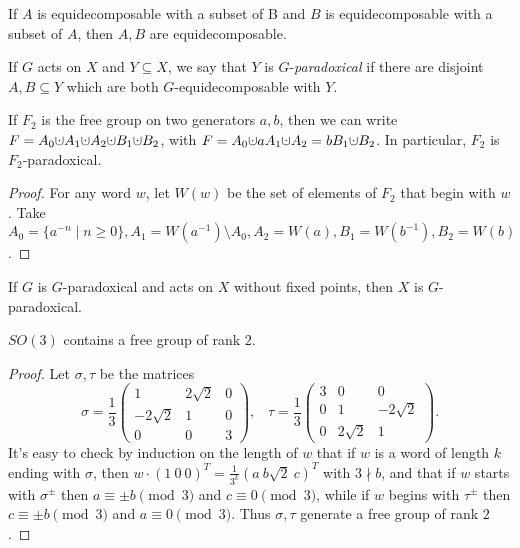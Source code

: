 \begin{prop} If $A$ is equidecomposable with a subset of B and $B$ is equidecomposable with a subset of $A$, then $A,B$ are equidecomposable.
\end{prop}

\begin{defn} If $G$ acts on $X$ and $Y \subseteq X$, we say that $Y$ is $G$-\emph{paradoxical} if there are disjoint $A,B \subseteq Y$ which are both $G$-equidecomposable with $Y$.
\end{defn}

\begin{prop} If $F_2$ is the free group on two generators $a,b$, then we can write $F = A_0 \dotcup A_1 \dotcup A_2 \dotcup B_1 \dotcup B_2$, with $F = A_0 \dotcup aA_1 \dotcup A_2 = bB_1 \dotcup B_2$. In particular, $F_2$ is $F_2$-paradoxical.
\end{prop}
\begin{proof} For any word $w$, let $W(w)$ be the set of elements of $F_2$ that begin with $w$. Take $A_0 = \{a^{-n} \mid n \ge 0\}, A_1 = W(a^{-1})\setminus A_0, A_2 = W(a), B_1 = W(b^{-1}), B_2 = W(b)$.
\end{proof}

\begin{prop} If $G$ is $G$-paradoxical and acts on $X$ without fixed points, then $X$ is $G$-paradoxical.
\end{prop}

\begin{lem} $SO(3)$ contains a free group of rank $2$.
\end{lem}
\begin{proof} Let $\sigma, \tau$ be the matrices
\[
\sigma = \frac{1}{3}\begin{pmatrix} 1 & 2\sqrt{2} & 0\\ -2\sqrt{2} & 1 & 0\\ 0 & 0 & 3 \end{pmatrix}, \;\;\; \tau = \frac{1}{3}\begin{pmatrix} 3 & 0 & 0\\ 0 & 1 & -2\sqrt{2}\\ 0 & 2\sqrt{2} & 1 \end{pmatrix}.
\]
It's easy to check by induction on the length of $w$ that if $w$ is a word of length $k$ ending with $\sigma$, then $w\cdot (1\ 0\ 0)^T = \frac{1}{3^k} (a\ b\sqrt{2}\ c)^T$ with $3 \nmid b$, and that if $w$ starts with $\sigma^{\pm}$ then $a \equiv \pm b \pmod{3}$ and $c \equiv 0 \pmod{3}$, while if $w$ begins with $\tau^{\pm}$ then $c \equiv \pm b \pmod{3}$ and $a \equiv 0 \pmod{3}$. Thus $\sigma, \tau$ generate a free group of rank $2$.
\end{proof}

